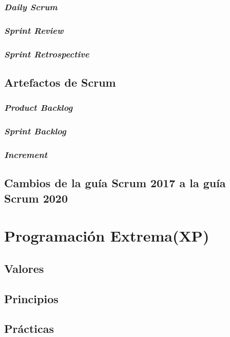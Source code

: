 		\subsubsection{\textit{Daily Scrum}}
		\subsubsection{\textit{Sprint Review}}
		\subsubsection{\textit{Sprint Retrospective}}
	\subsection{Artefactos de Scrum}
		\subsubsection{\textit{Product Backlog}}
		\subsubsection{\textit{Sprint Backlog}}
		\subsubsection{\textit{Increment}}
	\subsection{Cambios de la gu\'{i}a Scrum 2017 a la gu\'{i}a Scrum 2020}
\section{Programaci\'{o}n Extrema(XP)}
		\lipsum[1-2]
	\subsection{Valores}
	\subsection{Principios}
	\subsection{Pr\'{a}cticas}
